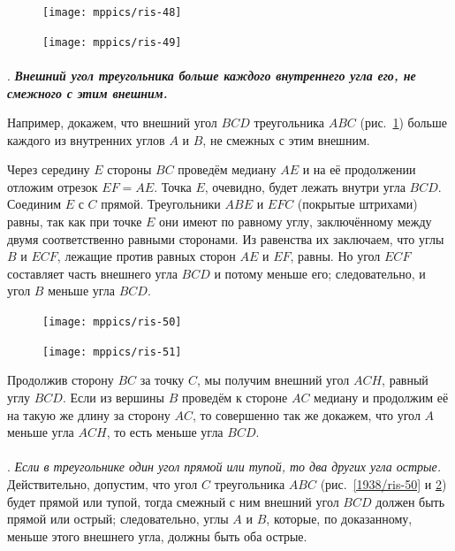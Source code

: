\documentclass[twoside]{book}
\begin{document}
\begin{figure}[h!]
\begin{minipage}{.48\textwidth}
\centering
\texttt{[image: mppics/ris-48]}
\end{minipage}\hfill
\begin{minipage}{.48\textwidth}
\centering
\texttt{[image: mppics/ris-49]}
\end{minipage}

\begin{minipage}{.48\textwidth}
\centering
\caption{}\label{1938/ris-48}
\end{minipage}\hfill
\begin{minipage}{.48\textwidth}
\centering
\caption{}\label{1938/ris-49}
\end{minipage}
\end{figure}

\paragraph{}\label{1938/44}
\mbox{.}
\textbf{\emph{Внешний угол треугольника больше каждого внутреннего угла его, не смежного с этим внешним.}}


Например, докажем, что внешний угол $BCD$ треугольника $ABC$
(рис.~\ref{1938/ris-49}) больше каждого из внутренних углов $A$ и $B$, не смежных с этим внешним.

Через середину $E$ стороны $BC$ проведём медиану $AE$ и на её продолжении отложим отрезок $EF=AE$.
Точка $E$, очевидно, будет лежать внутри угла $BCD$.
Соединим $E$ с $C$ прямой.
Треугольники $ABE$ и $EFC$ (покрытые штрихами) равны, так как при точке $E$ они имеют по равному углу, заключённому между двумя соответственно равными сторонами.
Из равенства их заключаем, что углы $B$ и $ECF$, лежащие против равных сторон $AE$ и $EF$, равны.
Но угол $ECF$ составляет часть внешнего угла $BCD$ и потому меньше его;
следовательно, и угол $B$ меньше угла $BCD$.

{

\begin{figure}
\centering
\texttt{[image: mppics/ris-50]}
\caption{}\label{1938/ris-50}
\centering
\texttt{[image: mppics/ris-51]}
\caption{}\label{1938/ris-51}
\end{figure}

Продолжив сторону $BC$ за точку $C$, мы получим внешний угол $ACH$, равный углу $BCD$.
Если из вершины $B$ проведём к стороне $AC$ медиану и продолжим её на такую же длину за сторону $AC$, то совершенно так же докажем, что угол $A$ меньше угла $ACH$, то есть меньше угла $BCD$.

\paragraph{}\label{1938/45}
\mbox{.}
\emph{Если в треугольнике один угол прямой или тупой, то два других угла острые.}
Действительно, допустим, что угол $C$ треугольника $ABC$ 
(рис.~\ref{1938/ris-50} и \ref{1938/ris-51}) будет прямой или тупой, тогда смежный с ним внешний угол $BCD$ должен быть прямой или острый;
следовательно, углы $A$ и $B$, которые, по доказанному, меньше этого внешнего угла, должны быть оба острые.

}
\end{document}
